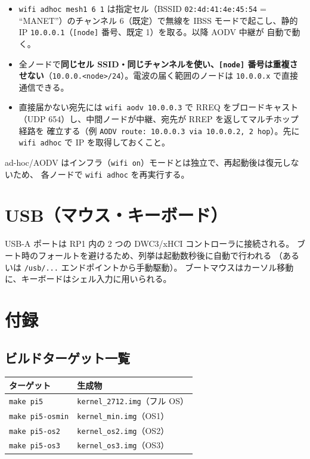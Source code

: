 \documentclass[a4paper,11pt]{ltjsarticle}
\newcommand{\cmd}[1]{\texttt{#1}}
\begin{document}
\begin{itemize}[noitemsep]
  \item \cmd{wifi adhoc mesh1 6 1} は指定セル（BSSID \texttt{02:4d:41:4e:45:54}
        = ``MANET''）のチャンネル 6（既定）で無線を IBSS モードで起こし、静的 IP
        \texttt{10.0.0.1}（\texttt{[node]} 番号、既定 1）を取る。以降 AODV 中継が
        自動で動く。
  \item 全ノードで\textbf{同じセル SSID・同じチャンネルを使い、\texttt{[node]}
        番号は重複させない}（\texttt{10.0.0.<node>/24}）。電波の届く範囲のノードは
        \texttt{10.0.0.x} で直接通信できる。
  \item 直接届かない宛先には \cmd{wifi aodv 10.0.0.3} で RREQ をブロードキャスト
        （UDP 654）し、中間ノードが中継、宛先が RREP を返してマルチホップ経路を
        確立する（例 \texttt{AODV route: 10.0.0.3 via 10.0.0.2, 2 hop}）。先に
        \cmd{wifi adhoc} で IP を取得しておくこと。
\end{itemize}
ad-hoc/AODV はインフラ（\cmd{wifi on}）モードとは独立で、再起動後は復元しないため、
各ノードで \cmd{wifi adhoc} を再実行する。

\section{USB（マウス・キーボード）}
\label{sec:usb}
USB-A ポートは RP1 内の 2 つの DWC3/xHCI コントローラに接続される。
ブート時のフォールトを避けるため、列挙は起動数秒後に自動で行われる
（あるいは \texttt{/usb/...} エンドポイントから手動駆動）。
ブートマウスはカーソル移動に、キーボードはシェル入力に用いられる。

\section{付録}

\subsection{ビルドターゲット一覧}
\begin{longtable}{ll}
\hline
ターゲット & 生成物 \\
\hline
\cmd{make pi5} & \texttt{kernel\_2712.img}（フル OS）\\
\cmd{make pi5-osmin} & \texttt{kernel\_min.img}（OS1）\\
\cmd{make pi5-os2} & \texttt{kernel\_os2.img}（OS2）\\
\cmd{make pi5-os3} & \texttt{kernel\_os3.img}（OS3）\\
\hline
\end{longtable}
\end{document}
